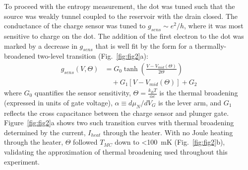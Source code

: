 \documentclass[twocolumn,showpacs,amsmath,amssymb,prl,aps,superscriptaddress]{revtex4-1}
\begin{document}
To proceed with the entropy measurement, the dot was tuned such that the source was weakly tunnel coupled to the reservoir with the drain closed.  The conductance of the charge sensor was tuned to $g_{sens}{\sim}e^2/h$, where it was most sensitive to charge on the dot.  The addition of the first electron to the dot was marked by a decrease in $g_{sens}$ that is well fit by the form for a thermally-broadened two-level transition (Fig.~\ref{fig:fig2}a):
%
\begin{align}
\label{eqn:g-sens}
        g_{sens}(V,\Theta) &= G_0 \tanh\left(\frac{V-V_{mid}(\Theta)}{2\Theta}\right)  \\
                        &\quad + G_1\left[V-V_{mid}(\Theta)\right] + G_2 \nonumber
\end{align}
%
where $G_0$ quantifies the sensor sensitivity, $\Theta = \frac{k_B T}{\alpha e}$ is the thermal broadening (expressed in units of gate voltage), $\alpha\equiv d \mu_{N}/d V_G$ is the lever arm, and $G_1$ reflects the cross capacitance between the charge sensor and plunger gate. Figure~\ref{fig:fig2}a shows two such transition curves with thermal broadening determined by the current, $I_{heat}$ through the heater. With no Joule heating through the heater, $\Theta$ followed $T_{MC}$ down to \SI{<100}{\milli\kelvin} (Fig.~\ref{fig:fig2}b), validating the approximation of thermal broadening used throughout this experiment.
\end{document}
